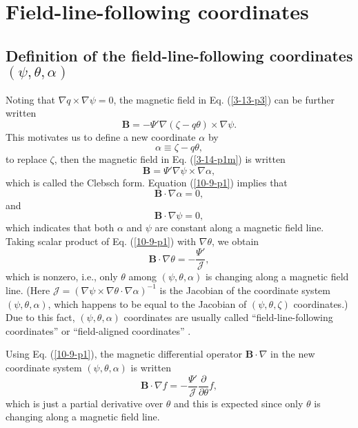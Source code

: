\documentclass{article}
\begin{document}
\section{Field-line-following coordinates}

\subsection{Definition of the field-line-following coordinates $(\psi, \theta,
\alpha)$}

Noting that $\nabla q \times \nabla \psi = 0$, the magnetic field in Eq.
(\ref{3-13-p3}) can be further written
\begin{equation}
  \label{3-14-p1m} \mathbf{B}= - \Psi' \nabla (\zeta - q \theta) \times \nabla
  \psi .
\end{equation}
This motivates us to define a new coordinate $\alpha$ by
\begin{equation}
  \label{17-3-18-1} \alpha \equiv \zeta - q \theta,
\end{equation}
to replace $\zeta$, then the magnetic field in Eq. (\ref{3-14-p1m}) is written
\begin{equation}
  \label{10-9-p1} \mathbf{B}= \Psi' \nabla \psi \times \nabla \alpha,
\end{equation}
which is called the Clebsch form. Equation (\ref{10-9-p1}) implies that
\begin{equation}
  \mathbf{B} \cdot \nabla \alpha = 0,
\end{equation}
and
\begin{equation}
  \mathbf{B} \cdot \nabla \psi = 0,
\end{equation}
which indicates that both $\alpha$ and $\psi$ are constant along a magnetic
field line. Taking scalar product of Eq. (\ref{10-9-p1}) with $\nabla \theta$,
we obtain
\begin{equation}
  \mathbf{B} \cdot \nabla \theta = - \frac{\Psi'}{\mathcal{J}},
\end{equation}
which is nonzero, i.e., only $\theta$ among $(\psi, \theta, \alpha)$ is
changing along a magnetic field line. (Here $\mathcal{J}= (\nabla \psi \times
\nabla \theta \cdot \nabla \alpha)^{- 1}$ is the Jacobian of the coordinate
system $(\psi, \theta, \alpha)$, which happens to be equal to the Jacobian of
$(\psi, \theta, \zeta)$ coordinates.) Due to this fact, $(\psi, \theta,
\alpha)$ coordinates are usually called ``field-line-following coordinates''
or ``field-aligned coordinates'' {\cite{beer1995,ychen2003}}.

Using Eq. (\ref{10-9-p1}), the magnetic differential operator $\mathbf{B}
\cdot \nabla$ in the new coordinate system $(\psi, \theta, \alpha)$ is written
\begin{equation}
  \label{10-25-e1} \mathbf{B} \cdot \nabla f = - \frac{\Psi'}{\mathcal{J}}
  \frac{\partial}{\partial \theta} f,
\end{equation}
which is just a partial derivative over $\theta$ and this is expected since
only $\theta$ is changing along a magnetic field line.
\end{document}
